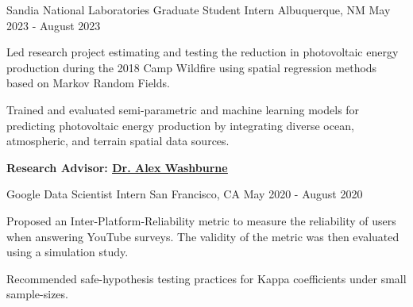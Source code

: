 
\begin{cventries}


  \cventry
    {Sandia National Laboratories} %
    {Graduate Student Intern} %
    {Albuquerque, NM} %
    {May 2023 - August 2023} %
    {
      \begin{cvitems} %
        \item Led research project estimating and testing the reduction in photovoltaic energy production during the 2018 Camp Wildfire \newline using spatial regression methods  based on Markov Random Fields.
        \item Trained and evaluated semi-parametric and machine learning models for predicting photovoltaic energy production by \newline integrating diverse ocean, atmospheric, and terrain spatial data sources.
        \item  \textbf{ Research Advisor:
\href{https://www.alexwashburne.com/}{\underline{Dr. Alex Washburne}}
}
      \end{cvitems}
    }
    
  \cventry
    {Google } %
    {Data Scientist Intern} %
    {San Francisco, CA} %
    {May 2020 - August 2020} %
    {
      \begin{cvitems} %
\item Proposed an Inter-Platform-Reliability metric to measure the reliability of users when answering YouTube surveys. \newline The validity of the metric was then evaluated using a simulation study.
\item Recommended safe-hypothesis testing practices for Kappa coefficients under small sample-sizes.
      \end{cvitems}
    }




\end{cventries}
